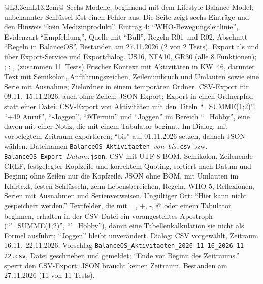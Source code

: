 \begin{longtable}{@{}L{3.3cm}L{13.2cm}@{}}
    {Sechs Modelle, beginnend mit dem Lifestyle Balance Model; unbekannter Schlüssel löst einen Fehler aus. Die Seite zeigt sechs Einträge und den Hinweis \enquote{kein Medizinprodukt}. Eintrag 4: \enquote{WHO-Bewegungsleitlinie}, Evidenzart \enquote{Empfehlung}, Quelle mit \enquote{Bull}, Regeln R01 und R02, Abschnitt \enquote{Regeln in BalanceOS}.}
    {Bestanden am 27.11.2026 (2 von 2 Tests).}
  \midrule
    {Export als  und  über Export-Service und Exportdialog.}
    {US16, NFA10, GR30}
    { (alle 8 Funktionen); ; : ,  (zusammen 11~Tests)}
    {Frischer Kontext mit Aktivitäten in KW~46, darunter Text mit Semikolon, Anführungszeichen, Zeilenumbruch und Umlauten sowie eine Serie mit Ausnahme; Zielordner in einem temporären Ordner.}
    {CSV-Export für 09.11.--15.11.2026, auch ohne Zeilen; JSON-Export; Export in einen Ordnerpfad statt einer Datei. CSV-Export von Aktivitäten mit den Titeln \enquote{=SUMME(1;2)}, \enquote{+49 Anruf}, \enquote{-Joggen}, \enquote{@Termin} und \enquote{Joggen} im Bereich \enquote{=Hobby}, eine davon mit einer Notiz, die mit einem Tabulator beginnt. Im Dialog: mit vorbelegtem Zeitraum exportieren; \enquote{bis} auf 01.11.2026 setzen, danach JSON wählen.}
    {Dateinamen \texttt{BalanceOS\_Aktivitaeten\_}\textit{von}\texttt{\_}\textit{bis}\texttt{.csv} bzw. \texttt{BalanceOS\_Export\_}\textit{Datum}\texttt{.json}. CSV mit \acs{UTF-8}-\acs{BOM}, Semikolon, Zeilenende CRLF, festgelegter Kopfzeile und korrektem Quoting, sortiert nach Datum und Beginn; ohne Zeilen nur die Kopfzeile. JSON ohne BOM, mit Umlauten im Klartext, festen Schlüsseln, zehn Lebensbereichen, Regeln, WHO-5, Reflexionen, Serien mit Ausnahmen und Serienverweisen. Ungültiger Ort: \enquote{Hier kann nicht gespeichert werden.} Textfelder, die mit =, +, -, @ oder einem Tabulator beginnen, erhalten in der CSV-Datei ein vorangestelltes Apostroph (\enquote{'=SUMME(1;2)}, \enquote{'=Hobby}), damit eine Tabellenkalkulation sie nicht als Formel ausführt; \enquote{Joggen} bleibt unverändert. Dialog: CSV vorgewählt, Zeitraum 16.11.--22.11.2026, Vorschlag \texttt{BalanceOS\_Aktivitaeten\_2026-11-16\_2026-11-22.csv}, Datei geschrieben und gemeldet; \enquote{Ende vor Beginn des Zeitraums.} sperrt den CSV-Export; JSON braucht keinen Zeitraum.}
    {Bestanden am 27.11.2026 (11 von 11 Tests).}

\end{longtable}
